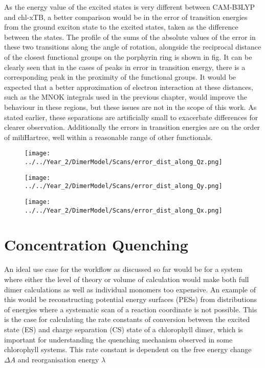 As the energy value of the excited states is very different between CAM-B3LYP and
chl-xTB, a better comparison would be in the error of transition energies from the
ground exciton state to the excited states, taken as the difference between the 
states. The profile of the sums of the absolute values of the error in these two
transitions along the angle of rotation, alongside the reciprocal distance of the
closest functional groups on the porphyrin ring is shown in fig. It can be clearly 
seen that in the cases of peaks in error in transition energy, there is a corresponding 
peak in the proximity of the functional groups. It would be expected that a better
approximation of electron interaction at these distances, such as the MNOK integrals
used in the previous chapter, would improve the behaviour in these regions, but 
these issues are not in the scope of this work. As stated earlier, these separations
are artificially small to exacerbate differences for clearer observation. Additionally
the errors in transition energies are on the order of miliHartree, well within a
reasonable range of other functionals.

\begin{figure}
    \centering
    \texttt{[image: ../../Year\_2/DimerModel/Scans/error\_dist\_along\_Qz.png]}
    \label{fig:error_along_qz}
\end{figure}

\begin{figure}
    \centering
    \texttt{[image: ../../Year\_2/DimerModel/Scans/error\_dist\_along\_Qy.png]}
    \label{fig:error_along_qy}
\end{figure}

\begin{figure}
    \centering
    \texttt{[image: ../../Year\_2/DimerModel/Scans/error\_dist\_along\_Qx.png]}
    \label{fig:error_along_qx}
\end{figure}

\afterpartskip

\section{Concentration Quenching}
An ideal use case for the workflow as discussed so far would be for a system where
either the level of theory or volume of calculation would make both full dimer calculations
as well as individual monomers too expensive. An example of this would be reconstructing
potential energy surfaces (PESs) from distributions of energies where a systematic
scan of a reaction coordinate is not possible. This is the case for calculating
the rate constants of conversion between the excited state (ES) and charge separation
(CS) state of a chlorophyll dimer, which is important for understanding the quenching
mechanism observed in some chlorophyll systems. This rate constant is dependent
on the free energy change $\Delta A$ and reorganisation energy $\lambda$

